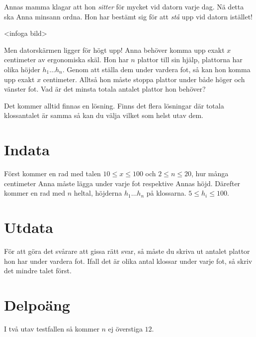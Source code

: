 Annas mamma klagar att hon \emph{sitter} för mycket vid datorn varje
dag. Nä detta ska Anna minsann ordna. Hon har bestämt sig för att
\emph{stå} upp vid datorn istället!

<infoga bild>

Men datorskärmen ligger för högt upp! Anna behöver komma upp exakt
$x$ centimeter av ergonomiska skäl. Hon har $n$ plattor till sin
hjälp, plattorna har olika höjder $h_1 \dots h_n$. Genom att ställa
dem under vardera fot, så kan hon komma upp exakt $x$ centimeter.
Alltså hon måste stoppa plattor under både höger och vänster fot.
Vad är det minsta totala antalet plattor hon behöver?

Det kommer alltid finnas en lösning. Finns det flera lösningar där
totala klossantalet är samma så kan du välja vilket som helst utav
dem.

\section*{Indata}

Först kommer en rad med talen $10 \leq x \leq 100$ och $2 \leq n \leq 20$, hur många centimeter Anna
måste lägga under varje fot respektive Annas höjd. Därefter kommer
en rad med $n$ heltal, höjderna $h_1 \dots h_n$ på klossarna. $5 \leq h_i \leq 100$.

\section*{Utdata}

För att göra det svårare att gissa rätt svar, så måste du skriva
ut antalet plattor hon har under vardera fot. Ifall det är olika antal
klossar under varje fot, så skriv det mindre talet först.

\section*{Delpoäng}

I två utav testfallen så kommer $n$ ej överstiga $12$.
